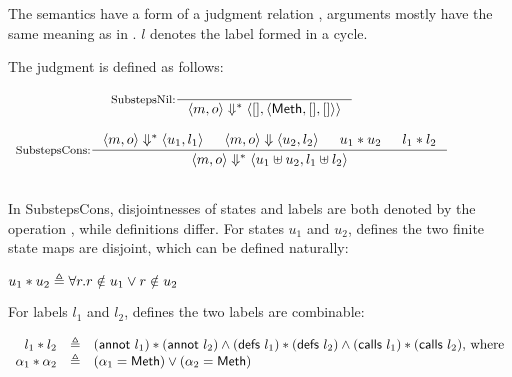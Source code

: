 The \Substeps{} semantics have a form of a judgment relation
, arguments mostly have the same meaning as in
\Substep{}. $l$ denotes the label formed in a cycle.

\begin{definition}
  \label{def-semsss}
  The judgment  is defined as follows:
  \begin{center}
    \begin{math}
      \begin{array}{c}
        \inference[SubstepsNil:]{}
                  {\semsss{m}{o}{\emptymap}
                    {\semlbl{\alphameth}{\emptymap}{\emptymap}}} \\
        \mbox{} \\
        \inference[SubstepsCons:]{\semsss{m}{o}{u_1}{l_1} & \semsstepr{m}{o}{u_2}{l_2} & \sdisj{u_1}{u_2} & \ldisj{l_1}{l_2}}
                  {\semsss{m}{o}{\splus{u_1}{u_2}}{\lplus{l_1}{l_2}}} \\
        \mbox{} \\
      \end{array}
    \end{math}
  \end{center}
\end{definition}

In SubstepsCons, disjointnesses of states and labels are both denoted
by the operation \sdisj{}{}, while definitions differ. For states
$u_1$ and $u_2$,  defines the two finite state maps
are disjoint, which can be defined naturally:

\begin{center}
  \begin{math}
    u_1 \ast u_2 \triangleq \forall r. r \notin u_1 \vee r \notin u_2
  \end{math}
\end{center}

For labels $l_1$ and $l_2$,  defines the two labels
are combinable:

\begin{definition}
  \label{def-ldisj}
  \mbox{}
  \begin{center}
    \begin{math}
      \begin{array}{rcl}
        l_1 \ast l_2 & \triangleq &
        (\textsf{annot}\ l_1) \ast (\textsf{annot}\ l_2) \wedge
        (\textsf{defs}\ l_1) \ast (\textsf{defs}\ l_2) \wedge
        (\textsf{calls}\ l_1) \ast (\textsf{calls}\ l_2) \textrm{, where} \\
        \alpha_1 \ast \alpha_2 & \triangleq &
        (\alpha_1 = \textsf{Meth}) \vee (\alpha_2 = \textsf{Meth}) \\
      \end{array}
    \end{math}
  \end{center}
\end{definition}

